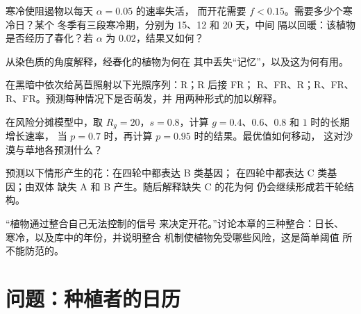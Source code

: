 \begin{exercise}[$\star\star$]\label{exo:b2:plant-flowering:7}
寒冷使阻遏物以每天 $\alpha = 0.05$ 的速率失活，
而开花需要 $f < 0.15$。需要多少个寒冷日？某个
冬季有三段寒冷期，分别为 15、12 和 20 天，中间
隔以回暖：该植物是否经历了春化？若 $\alpha$ 为 $0.02$，结果又如何？
\end{exercise}

\begin{exercise}[$\star\star$]\label{exo:b2:plant-flowering:8}
从染色质的角度解释，经春化的植物为何在
其中丢失“记忆”，以及这为何有用。
\end{exercise}

\begin{exercise}[$\star\star$]\label{exo:b2:plant-flowering:9}
在黑暗中依次给莴苣照射以下光照序列：R；R 后接 FR；
R、FR、R；R、FR、R、FR。预测每种情况下是否萌发，并
用两种形式的加以解释。
\end{exercise}

\begin{exercise}[$\star\star\star$]\label{exo:b2:plant-flowering:10}
在风险分摊模型中，取 $R_g = 20$，$s = 0.8$，计算
$g = 0.4$、$0.6$、$0.8$ 和 $1$ 时的长期增长速率，
当 $p = 0.7$ 时，再计算 $p = 0.95$ 时的结果。最优值如何移动，
这对沙漠与草地各预测什么？
\end{exercise}

\begin{exercise}[$\star\star\star$]\label{exo:b2:plant-flowering:11}
预测以下情形产生的花：在四轮中都表达 B 类基因；
在四轮中都表达 C 类基因；由双体
缺失 A 和 B 产生。随后解释缺失 C 的花为何
仍会继续形成若干轮结构。
\end{exercise}

\begin{exercise}[$\star\star\star$]\label{exo:b2:plant-flowering:12}
“植物通过整合自己无法控制的信号
来决定开花。”讨论本章的三种整合：日长、
寒冷，以及库中的年份，并说明整合
机制使植物免受哪些风险，这是简单阈值
所不能防范的。
\end{exercise}

\section{问题：种植者的日历}

